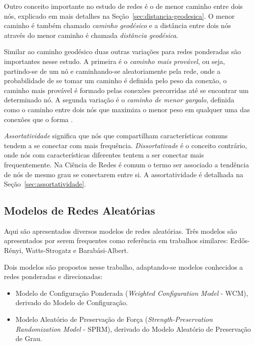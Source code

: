 \documentclass[12pt,a4paper]{article}
\theoremstyle{hypo}
\begin{document}
Outro conceito importante no estudo de redes é o de menor caminho entre dois nós, explicado em mais detalhes na Seção~\ref{sec:distancia-geodesica}. O menor caminho é também chamado \textit{caminho geodésico} e a distância entre dois nós através do menor caminho é chamada \textit{distância geodésica}.

Similar ao caminho geodésico duas outras variações para redes ponderadas são importantes nesse estudo. A primeira é o \textit{caminho mais provável}, ou seja, partindo-se de um nó e caminhando-se aleatoriamente pela rede, onde a probabilidade de se tomar um caminho é definida pelo peso da conexão, o caminho mais provável é formado pelas conexões percorridas até se encontrar um determinado nó. A segunda variação é o \textit{caminho de menor gargalo}, definida como o caminho entre dois nós que maximiza o menor peso em qualquer uma das conexões que o forma \cite{Goldbarg2012-uc}.

\textit{Assortatividade} significa que nós que compartilham características comuns tendem a se conectar com mais frequência. \textit{Dissortativade} é o conceito contrário, onde nós com características diferentes tentem a ser conectar mais frequentemente. Na Ciência de Redes é comum o termo ser associado a tendência de nós de mesmo grau se conectarem entre si. A assortatividade é detalhada na Seção~\ref{sec:assortatividade}.

\subsection{Modelos de Redes Aleatórias}

Aqui são apresentados diversos modelos de redes aleatórias. Três modelos são apresentados por serem frequentes como referência em trabalhos similares: Erdős-Rényi, Watts-Strogatz e Barabási-Albert.

Dois modelos são propostos nesse trabalho, adaptando-se modelos conhecidos a redes ponderadas e direcionadas:
\begin{itemize}
\item Modelo de Configuração Ponderada (\textit{Weighted Configuration Model} - WCM), derivado do Modelo de Configuração.
\item Modelo Aleatório de Preservação de Força (\textit{Strength-Preservation Randomization Model} - SPRM), derivado do Modelo Aleatório de Preservação de Grau.
\end{itemize}
\end{document}
